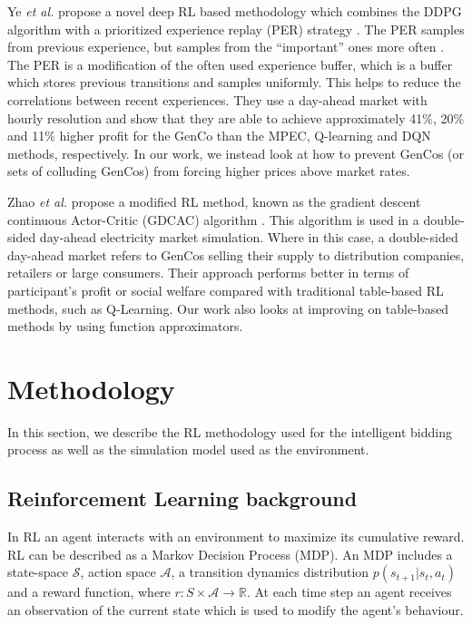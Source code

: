 Ye \textit{et al.} propose a novel deep RL based methodology which combines the DDPG algorithm with a prioritized experience replay (PER) strategy \cite{Ye2020a}. The PER samples from previous experience, but samples from the ``important'' ones more often \cite{Schaul2016}. The PER is a modification of the often used experience buffer, which is a buffer which stores previous transitions and samples uniformly. This helps to reduce the correlations between recent experiences. They use a day-ahead market with hourly resolution and show that they are able to achieve approximately 41\%, 20\% and 11\% higher profit for the GenCo than the MPEC, Q-learning and DQN methods, respectively. In our work, we instead look at how to prevent GenCos (or sets of colluding GenCos) from forcing higher prices above market rates.



Zhao \textit{et al.} propose a modified RL method, known as the gradient descent continuous Actor-Critic (GDCAC) algorithm \cite{Zhao2016}. This algorithm is used in a double-sided day-ahead electricity market simulation. Where in this case, a double-sided day-ahead market refers to GenCos selling their supply to distribution companies, retailers or large consumers. Their approach performs better in terms of participant's profit or social welfare compared with traditional table-based RL methods, such as Q-Learning. Our work also looks at improving on table-based methods by using function approximators.





\section{Methodology}
\label{rl:sec:material}

In this section, we describe the RL methodology used for the intelligent bidding process as well as the simulation model used as the environment.

\subsection{Reinforcement Learning background}


In RL an agent interacts with an environment to maximize its cumulative reward. RL can be described as a Markov Decision Process (MDP). An MDP includes a state-space $\mathcal{S}$, action space $\mathcal{A}$, a transition dynamics distribution $p(s_{t+1}|s_t,a_t)$ and a reward function, where $r:S\times \mathcal{A} \rightarrow \mathbb{R}$. At each time step an agent receives an observation of the current state which is used to modify the agent's behaviour.

